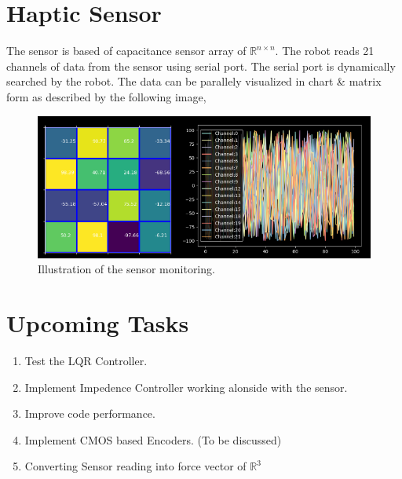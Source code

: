 \documentclass[12pt]{article}
\begin{document}
\section{Haptic Sensor}
    The sensor is based of capacitance sensor array of $\mathbb{R}^{n \times n}$. 
    The robot reads 21 channels of data from the sensor using serial port.
    The serial port is dynamically searched by the robot.
    The data can be parallely visualized in chart \& matrix form as described by the following image,
    \begin{figure}[h]
        \centering
        \includegraphics[scale=0.65]{sensor_monitor.png}
        \caption{Illustration of the sensor monitoring.}
    \end{figure}

\section{Upcoming Tasks}
    \begin{enumerate}
        \item Test the LQR Controller.
        \item Implement Impedence Controller working alonside with the sensor.
        \item Improve code performance.
        \item Implement CMOS based Encoders. (To be discussed)
        \item Converting Sensor reading into force vector of $\mathbb{R}^3$
    \end{enumerate}

    
    
   
\end{document}
